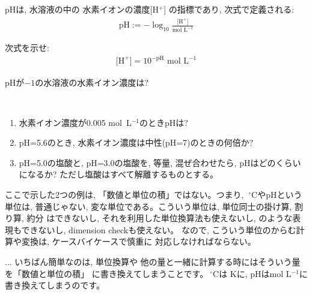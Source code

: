 \begin{exmpl} pHは, 水溶液の中の
水素イオンの濃度[H$^+$]
の指標であり, 次式で定義される:
\begin{eqnarray}
\text{pH}:=-\log_{10}\frac{\text{[H}^+\text{]}}{\text{mol~L}^{-1}}\label{eq:define_pH}
\end{eqnarray}
\end{exmpl}

\begin{q}\label{q:pH2density} 次式を示せ:
\begin{eqnarray}
\text{[H}^+\text{]}=10^{-\text{pH}}\text{ mol~L}^{-1}\label{eq:pH2density}
\end{eqnarray}
\end{q}

\begin{q}\label{q:pH0} pHが$-1$の水溶液の水素イオン濃度は?\end{q}

\begin{q}\label{q:exp_pH}　
\begin{enumerate}
\item 水素イオン濃度が0.005 mol~L$^{-1}$のときpHは?
\item pH=5.6のとき, 水素イオン濃度は中性(pH=7)のときの何倍か? 
\item pH=5.0の塩酸と, pH=3.0の塩酸を, 等量, 混ぜ合わせたら, 
pHはどのくらいになるか? ただし塩酸はすべて解離するものとする。
\end{enumerate}\end{q}


ここで示した2つの例は, 「数値と単位の積」ではない。つまり, 
$\ {}^\circ\mathrm{C}$やpHという単位は, 普通じゃない, 
変な単位である。こういう単位は, 単位同士の掛け算, 割り算, 約分
はできないし, それを利用した単位換算法も使えないし, 
のような表現もできないし, dimension checkも使えない。
なので, こういう単位のからむ計算や変換は, ケースバイケースで慎重に
対応しなければならない。

\begin{faq}{\small{}... いちばん簡単なのは, 単位換算や
他の量と一緒に計算する時にはそういう量を「数値と単位の積」
に書き換えてしまうことです。$\ {}^\circ\mathrm{C}$は
Kに, pHはmol L$^{-1}$に書き換えてしまうのです。}\end{faq}


